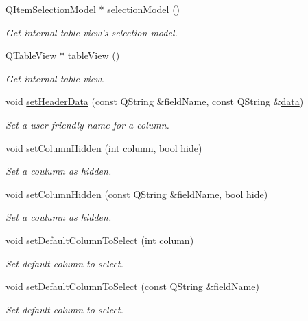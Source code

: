 \begin{DoxyCompactItemize}
Q\-Item\-Selection\-Model $\ast$ \hyperlink{classmdt_sql_table_widget_a47fc691f2cd9cc40749c987ce2bbea6d}{selection\-Model} ()
\begin{DoxyCompactList}\small\item\em Get internal table view's selection model. \end{DoxyCompactList}\item 
Q\-Table\-View $\ast$ \hyperlink{classmdt_sql_table_widget_af40eeb001ec262830daba6b311927ede}{table\-View} ()
\begin{DoxyCompactList}\small\item\em Get internal table view. \end{DoxyCompactList}\item 
void \hyperlink{classmdt_sql_table_widget_a591461ee19f22008a5c310609461081e}{set\-Header\-Data} (const Q\-String \&field\-Name, const Q\-String \&\hyperlink{classmdt_abstract_sql_widget_a3d362ebfc2d4f4b40b48ca08db287b3c}{data})
\begin{DoxyCompactList}\small\item\em Set a user friendly name for a column. \end{DoxyCompactList}\item 
void \hyperlink{classmdt_sql_table_widget_a466ff75bee2a0efd99c62994f65a5d18}{set\-Column\-Hidden} (int column, bool hide)
\begin{DoxyCompactList}\small\item\em Set a coulumn as hidden. \end{DoxyCompactList}\item 
void \hyperlink{classmdt_sql_table_widget_ae1eefd42d91ea36fa4244d7f265d7222}{set\-Column\-Hidden} (const Q\-String \&field\-Name, bool hide)
\begin{DoxyCompactList}\small\item\em Set a coulumn as hidden. \end{DoxyCompactList}\item 
void \hyperlink{classmdt_sql_table_widget_a6c54d9c26f7bb6241607785586bcc52e}{set\-Default\-Column\-To\-Select} (int column)
\begin{DoxyCompactList}\small\item\em Set default column to select. \end{DoxyCompactList}\item 
void \hyperlink{classmdt_sql_table_widget_a17d60fda061030fdfe15be5445eadc76}{set\-Default\-Column\-To\-Select} (const Q\-String \&field\-Name)
\begin{DoxyCompactList}\small\item\em Set default column to select. \end{DoxyCompactList}\item 

\end{DoxyCompactItemize}
